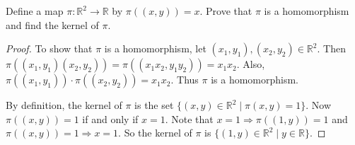 \documentclass{article}
\begin{document}
Define a map $\pi: \mathbb{R}^2 \rightarrow \mathbb{R}$ by $\pi((x, y)) = x$. Prove that $\pi$ is a homomorphism and find the kernel of $\pi$.

\begin{proof}
    To show that $\pi$ is a homomorphism, let $(x_1, y_1), (x_2, y_2) \in \mathbb{R}^2$. Then $\pi((x_1, y_1)(x_2, y_2)) = \pi((x_1 x_2, y_1 y_2)) = x_1 x_2$. Also, $\pi((x_1, y_1)) \cdot \pi((x_2, y_2)) = x_1 x_2$. Thus $\pi$ is a homomorphism.

    By definition, the kernel of $\pi$ is the set $\{ (x, y) \in \mathbb{R}^2 \mid \pi(x, y) = 1 \}$. Now $\pi((x, y)) = 1$ if and only if $x = 1$. Note that $x = 1 \Rightarrow \pi((1, y)) = 1$ and $\pi((x, y)) = 1 \Rightarrow x = 1$. So the kernel of $\pi$ is $\{ (1, y) \in \mathbb{R}^2 \mid y \in \mathbb{R} \}$.
\end{proof}
\end{document}
